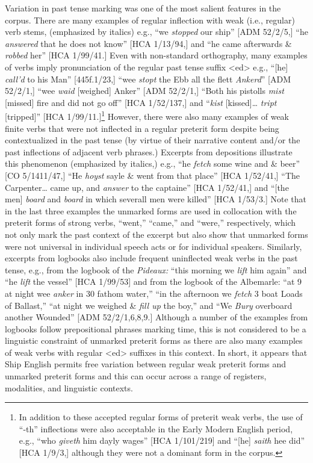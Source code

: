   Variation in past tense marking was one of the most salient features in the corpus. There are many examples of regular inflection with weak (i.e., regular) verb stems, (emphasized by italics) e.g., “we \textit{stopped} our ship” [ADM 52/2/5,] “he \textit{answered} that he does not know” [HCA 1/13/94,] and “he came afterwards \&  \textit{robbed} her” [HCA 1/99/41.] Even with non-standard orthography, many examples of verbs imply pronunciation of the regular past tense suffix <ed> e.g., “[he] \textit{call’d} to his Man” [445f.1/23,] “wee \textit{stopt} the Ebb all the flett \textit{Ankerd}” [ADM 52/2/1,] “wee \textit{waid} [weighed] Anker” [ADM 52/2/1,] “Both his pistolls \textit{mist} [missed] fire and did not go off” [HCA 1/52/137,] and “\textit{kist} [kissed]… \textit{tript} [tripped]” [HCA 1/99/11.]\footnote{In addition to these accepted regular forms of preterit weak verbs, the use of “-th” inflections were also acceptable in the Early Modern English period, e.g., “who \textit{giveth} him dayly wages” [HCA 1/101/219] and “[he] \textit{saith} hee did” [HCA 1/9/3,] although they were not a dominant form in the corpus.} However, there were also many examples of weak finite verbs that were not inflected in a regular preterit form despite being contextualized in the past tense (by virtue of their narrative content and/or the past inflections of adjacent verb phrases.) Excerpts from depositions illustrate this phenomenon (emphasized by italics,) e.g., “he \textit{fetch} some wine and \& beer” [CO 5/1411/47,] “He \textit{hoyst} sayle \& went from that place” [HCA 1/52/41,] “The Carpenter… came up, and \textit{answer} to the captaine” [HCA 1/52/41,] and “[the men] \textit{board} and \textit{board} in which severall men were killed” [HCA 1/53/3.] Note that in the last three examples the unmarked forms are used in collocation with the preterit forms of strong verbs, “went,” “came,” and “were,” respectively, which not only mark the past context of the excerpt but also show that unmarked forms were not universal in individual speech acts or for individual speakers. Similarly, excerpts from logbooks also include frequent uninflected weak verbs in the past tense, e.g., from the logbook of the \textit{Pideaux:} “this morning we \textit{lift} him again” and “he \textit{lift} the vessel” [HCA 1/99/53] and from the logbook of the Albemarle: “at 9 at night wee \textit{anker} in 30 fathom water,” “in the afternoon we \textit{fetch} 3 boat Loads of Ballast,” “at night we weighed \& \textit{fill up} the boy,” and “We \textit{Bury} overboard another Wounded” [ADM 52/2/1,6,8,9.] Although a number of the examples from logbooks follow prepositional phrases marking time, this is not considered to be a linguistic constraint of unmarked preterit forms as there are also many examples of weak verbs with regular <ed> suffixes in this context. In short, it appears that Ship English permits free variation between regular weak preterit forms and unmarked preterit forms and this can occur across a range of registers, modalities, and linguistic contexts. 

